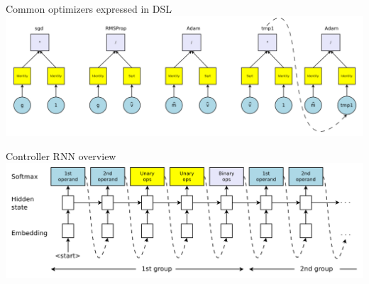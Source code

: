 \documentclass{beamer}
\begin{document}
{%
\begin{frame}{Common optimizers expressed in DSL}
        \center{}
        \hspace*{-1.0cm}
        \includegraphics[scale=0.32]{data/common_opts}
\end{frame}
}

{%
\begin{frame}{Controller RNN overview}
        \center{}
        \hspace*{-1.0cm}
        \includegraphics[scale=0.32]{data/neural_opt_controller}
\end{frame}
}
\end{document}
